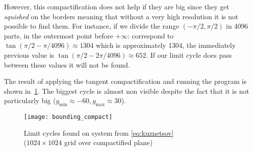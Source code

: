 However, this compactification does not help if they are big since they get
\emph{squished} on the borders meaning that without a very high resolution it is
not possible to find them. For instance, if we divide the range $(-\pi/2,
\pi/2)$ in 4096 parts, in the outermost point before $+\infty$: correspond to
$\tan\left(\pi/2 - \pi/4096\right) \approx 1304$ which is approximately 1304, the
immediately previous value is $\tan\left(\pi/2 - 2\pi/4096\right) \approx 652$. If
our limit cycle does pass between these values it will not be found.


The result of applying the tangent compactification and running the program is shown
in~\cref{fig:bounding_compact}. The biggest cycle is almost non visible despite the fact that it is not particularly big ($y_{\min} \approx -60, y_{\max} \approx 30$).

\begin{figure}[H]
    \centering
    \texttt{[image: bounding\_compact]}
    \caption{Limit cycles found on system from \cref{eq:kuznetsov} \\
        ($1024 \times 1024$ grid over compactified plane)
    }%
    \label{fig:bounding_compact}
\end{figure}
